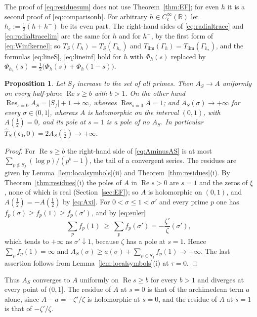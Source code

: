 \documentclass[11pt]{amsart}
\newtheorem{proposition}[theorem]{Proposition}
\theoremstyle{remark}
\numberwithin{equation}{section}
\newcommand{\R}{\mathbb R}
\newcommand{\Rel}{\operatorname{Re}}
\newcommand{\Res}{\operatorname*{Res}}
\newcommand{\cz}{\mathfrak c_0}
\newcommand{\Tl}{T_{\lim}}
\begin{document}
The proof of \eqref{eq:residuesum} does not use Theorem~\ref{thm:EF}; for
even $h$ it is a second proof of \eqref{eq:comparisonh}.  For arbitrary
$h\in C_c^\infty(\R)$ let $h_e:=\tfrac12(h+h^-)$ be its even part.  The
right-hand sides of \eqref{eq:radialtrace} and \eqref{eq:radialtracelim}
are the same for $h$ and for $h^-$, by the first form of
\eqref{eq:Winfkernel}; so $T_S(\Gamma_h)=T_S(\Gamma_{h_e})$ and
$\Tl(\Gamma_h)=\Tl(\Gamma_{h_e})$, and the formulas \eqref{eq:lineS},
\eqref{eq:lineinf} hold for $h$ with $\Phi_h(s)$ replaced by
$\Phi_{h_e}(s)=\tfrac12\bigl(\Phi_h(s)+\Phi_h(1-s)\bigr)$.

\begin{proposition}
\label{cor:noncommute}
Let $S_f$ increase to the set of all primes.  Then $A_S\to A$ uniformly on
every half-plane $\Rel s\ge b$ with $b>1$.  On the other hand
$\Res_{s=0}A_S=|S_f|+1\to\infty$, whereas $\Res_{s=0}A=1$; and
$A_S(\sigma)\to+\infty$ for every $\sigma\in(0,1]$, whereas $A$ is
holomorphic on the interval $(0,1)$, with $A(\tfrac12)=0$, and its pole at
$s=1$ is a pole of no $A_S$.  In particular
$\widehat T_S(\cz,0)=2A_S(\tfrac12)\to+\infty$.
\end{proposition}

\begin{proof}
For $\Rel s\ge b$ the right-hand side of \eqref{eq:AminusAS} is at most
$\sum_{p\notin S_f}(\log p)/(p^b-1)$, the tail of a convergent series.  The
residues are given by Lemma~\ref{lem:localsymbols}(ii) and
Theorem~\ref{thm:residues}(i).  By Theorem~\ref{thm:residues}(i) the poles
of $A$ in $\Rel s>0$ are $s=1$ and the zeros of $\xi$, none of which is real
(Section~\ref{sec:EF}); so $A$ is holomorphic on $(0,1)$, and
$A(\tfrac12)=-A(\tfrac12)$ by \eqref{eq:Axi}.  For $0<\sigma\le1<\sigma'$ and every prime
$p$ one has $f_p(\sigma)\ge f_p(1)\ge f_p(\sigma')$, and by \eqref{eq:euler}
\[
  \sum_pf_p(1)\ \ge\ \sum_pf_p(\sigma')=-\frac{\zeta'}{\zeta}(\sigma'),
\]
which tends to $+\infty$ as $\sigma'\downarrow1$, because $\zeta$ has a pole
at $s=1$.  Hence $\sum_pf_p(1)=\infty$ and
$A_S(\sigma)\ge a(\sigma)+\sum_{p\in S_f}f_p(1)\to+\infty$.  The last
assertion follows from Lemma~\ref{lem:localsymbols}(i) at $\tau=0$.
\end{proof}

Thus $A_S$ converges to $A$ uniformly on $\Rel s\ge b$ for every $b>1$ and
diverges at every point of $(0,1]$.  The residue of $A$ at $s=0$ is that of
the archimedean term $a$ alone, since $A-a=-\zeta'/\zeta$ is holomorphic at
$s=0$, and the residue of $A$ at $s=1$ is that of $-\zeta'/\zeta$.
\end{document}
